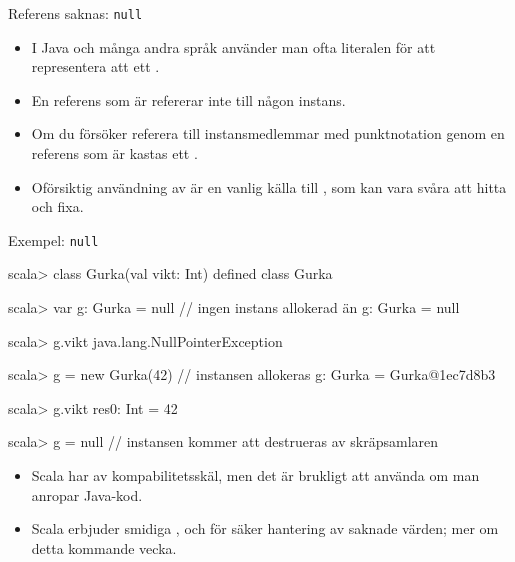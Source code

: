 
\begin{Slide}{Referens saknas: \texttt{null}}
\begin{itemize}
\item I Java och många andra språk använder man ofta literalen  för att representera att ett .

\item En referens som är  refererar inte till någon instans.

\item Om du försöker referera till instansmedlemmar med punktnotation genom en referens som är  kastas ett  .

\item Oförsiktig användning av  är en vanlig källa till , som kan vara svåra att hitta och fixa.

\end{itemize}
\end{Slide}


\begin{Slide}{Exempel: \texttt{null}}
\begin{REPL}
scala> class Gurka(val vikt: Int)
defined class Gurka

scala> var g: Gurka = null        // ingen instans allokerad än
g: Gurka = null

scala> g.vikt
java.lang.NullPointerException

scala> g = new Gurka(42)          // instansen allokeras
g: Gurka = Gurka@1ec7d8b3

scala> g.vikt
res0: Int = 42

scala> g = null         // instansen kommer att destrueras av skräpsamlaren
\end{REPL}

\begin{itemize} \SlideFontSmall
\item Scala har  av kompabilitetsskäl, men det är brukligt att  använda  om man anropar Java-kod.

\item Scala erbjuder smidiga ,  och  för säker hantering av saknade värden; mer om detta kommande vecka.



\end{itemize}
\end{Slide}






